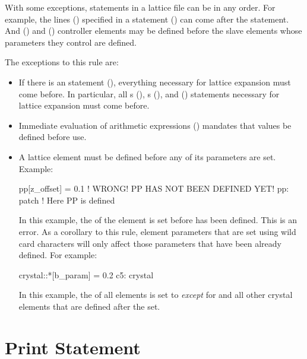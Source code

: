 {{{{{With some exceptions, statements in a lattice file can be in any order. For example, the lines
() specified in a  statement () can come after the 
statement. And  () and  () controller elements
may be defined before the slave elements whose parameters they control are defined.

The exceptions to this rule are:
\begin{itemize}
\item 
If there is an  statement (), everything necessary for
lattice expansion must come before. In particular, all s
(), s (), and  () statements
necessary for lattice expansion must come before.
\item
Immediate evaluation of arithmetic expressions () mandates that values be defined
before use.
\item
A lattice element must be defined before any of its parameters are set. Example:
\begin{example2}
  pp[z_offset] = 0.1    ! WRONG! PP HAS NOT BEEN DEFINED YET!
  pp: patch             ! Here PP is defined
\end{example2}
In this example, the  of the element  is set before  has been
defined. This is an error. As a corollary to this rule, element parameters that are set 
using wild card characters will only affect those parameters that have been already defined. For
example:
\begin{example2}
  crystal::*[b_param] = 0.2
  c5: crystal
\end{example2}
In this example, the  of all  elements is set to  {\em except} for
 and all other crystal elements that are defined after the set.
\end{itemize}

\section{Print Statement}
\label{s:print}

}}}}}
